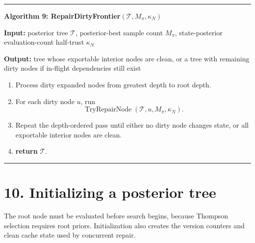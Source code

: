 \documentclass[11pt]{article}
\newcommand{\Tree}{\mathcal{T}}
\newcommand{\TryRepairNode}{\operatorname{TryRepairNode}}
\newenvironment{algorithmblock}[1]
{
  \par\medskip
  \noindent\hrule\par\smallskip
  \noindent\textbf{#1}
  \par\smallskip
}
{
  \par\smallskip\noindent\hrule\par\medskip
}
\newcommand{\Input}{\textbf{Input: }}
\newcommand{\Output}{\textbf{Output: }}
\newcommand{\Return}{\textbf{return }}
\begin{document}
\begin{algorithmblock}{Algorithm 9: RepairDirtyFrontier\((\Tree,M_\pi,\kappa_N)\)}

\Input posterior tree \(\Tree\), posterior-best sample count \(M_\pi\), state-posterior evaluation-count half-trust \(\kappa_N\)

\Output tree whose exportable interior nodes are clean, or a tree with remaining dirty nodes if in-flight dependencies still exist

\begin{enumerate}[leftmargin=2em]
  \item Process dirty expanded nodes from greatest depth to root depth.

  \item For each dirty node \(u\), run
  \[
  \TryRepairNode(\Tree,u,M_\pi,\kappa_N).
  \]

  \item Repeat the depth-ordered pass until either no dirty node changes state,
  or all exportable interior nodes are clean.

  \item \Return \(\Tree\).
\end{enumerate}

\end{algorithmblock}


\section*{10. Initializing a posterior tree}

The root node must be evaluated before search begins, because Thompson selection
requires root priors. Initialization also creates the version counters and clean
cache state used by concurrent repair.
\end{document}
